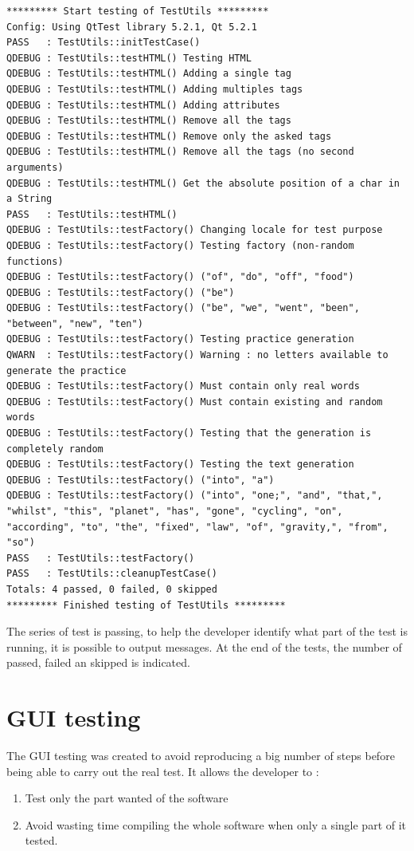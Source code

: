 \begin{lstlisting}
********* Start testing of TestUtils *********
Config: Using QtTest library 5.2.1, Qt 5.2.1
PASS   : TestUtils::initTestCase()
QDEBUG : TestUtils::testHTML() Testing HTML 
QDEBUG : TestUtils::testHTML() Adding a single tag 
QDEBUG : TestUtils::testHTML() Adding multiples tags 
QDEBUG : TestUtils::testHTML() Adding attributes 
QDEBUG : TestUtils::testHTML() Remove all the tags 
QDEBUG : TestUtils::testHTML() Remove only the asked tags 
QDEBUG : TestUtils::testHTML() Remove all the tags (no second arguments) 
QDEBUG : TestUtils::testHTML() Get the absolute position of a char in a String 
PASS   : TestUtils::testHTML()
QDEBUG : TestUtils::testFactory() Changing locale for test purpose 
QDEBUG : TestUtils::testFactory() Testing factory (non-random functions) 
QDEBUG : TestUtils::testFactory() ("of", "do", "off", "food") 
QDEBUG : TestUtils::testFactory() ("be") 
QDEBUG : TestUtils::testFactory() ("be", "we", "went", "been", "between", "new", "ten") 
QDEBUG : TestUtils::testFactory() Testing practice generation 
QWARN  : TestUtils::testFactory() Warning : no letters available to generate the practice 
QDEBUG : TestUtils::testFactory() Must contain only real words 
QDEBUG : TestUtils::testFactory() Must contain existing and random words 
QDEBUG : TestUtils::testFactory() Testing that the generation is completely random 
QDEBUG : TestUtils::testFactory() Testing the text generation 
QDEBUG : TestUtils::testFactory() ("into", "a") 
QDEBUG : TestUtils::testFactory() ("into", "one;", "and", "that,", "whilst", "this", "planet", "has", "gone", "cycling", "on", "according", "to", "the", "fixed", "law", "of", "gravity,", "from", "so") 
PASS   : TestUtils::testFactory()
PASS   : TestUtils::cleanupTestCase()
Totals: 4 passed, 0 failed, 0 skipped
********* Finished testing of TestUtils *********
\end{lstlisting}
The series of test is passing, to help the developer identify what part of the test is running, it is possible to output messages.
At the end of the tests, the number of passed, failed an skipped is indicated.

\chapter{GUI testing}
The GUI testing was created to avoid reproducing a big number of steps before being able to carry out the real test. It allows the developer to :
\begin{enumerate}
	\item Test only the part wanted of the software
	\item Avoid wasting time compiling the whole software when only a single part of it tested.
\end{enumerate}

